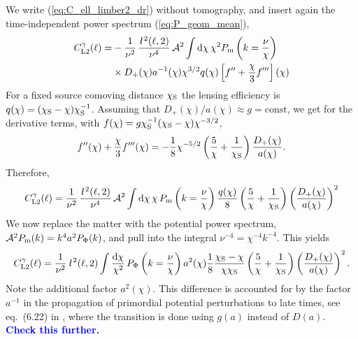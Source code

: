 \documentclass[useAMS,usenatbib]{mn2e} %
\newcommand{\ellbar}{\hbox{\it \l}\,}
\newcommand{\pref}{{\cal A}}
\newcommand{\mk}[1]{{\bf\textcolor{blue}{#1}}}
\begin{document}
\begin{appendix}
We write (\ref{eq:C_ell_limber2_dr}) without tomography, and insert again the
time-independent power spectrum (\ref{eq:P_geom_mean}),
%
\begin{align}
  C^\gamma_{{\rm L2}}(\ell) = & - \frac 1 {\nu^2} \, \frac{\ellbar^2(\ell, 2)}{\nu^4} \, \pref^2
    \int {\rm d} \chi \, \chi^{2} P_{\rm m}\left(k = \frac\nu\chi\right)
    \nonumber \\
    & \times D_+(\chi) a^{-1}(\chi) \chi^{3/2} q(\chi) \left[ f^{\prime\prime} 
      + \frac{\chi}{3} f^{\prime\prime\prime} 
    \right](\chi)
  \label{eq:C_ell_limber2_dr_notomo}
\end{align}
%
For a fixed source comoving distance $\chi_{\rm S}$ the lensing efficiency is
$q(\chi) = (\chi_{\rm S} - \chi) \chi_{\rm S}^{-1}$. Assuming that
$D_+(\chi)/a(\chi) \approx g = \mbox{const}$, we get for the derivative terms,
with $f(\chi) = g \chi_{\rm S}^{-1} (\chi_{\rm S} - \chi) \chi^{-3/2}$,
%
\begin{equation}
  f^{\prime\prime}(\chi) + \frac{\chi}{3} f^{\prime\prime\prime}(\chi)
    = - \frac 1 8 \chi^{-5/2} \left( \frac 5 \chi
          + \frac 1 {\chi_{\rm S}} \right) \frac{D_+(\chi)}{a(\chi)}.
\end{equation}
%
Therefore,
%
\begin{align}
  C^\gamma_{{\rm L2}}(\ell) = \frac 1 {\nu^2} \, \frac{\ellbar^2(\ell, 2)}{\nu^4} \, \pref^2
    \int {\rm d} \chi \, \chi \, P_{\rm m}\left(k = \frac\nu\chi\right)
    \frac{q(\chi)}{8} \left( \frac 5 \chi + \frac 1 {\chi_{\rm S}} \right)
      \left(\frac{D_+(\chi)}{a(\chi)}\right)^2 
\end{align}
%
We now replace the matter with the potential power spectrum, ${\cal A}^2 P_{\rm m}(k) = k^{4} a^2 P_\Phi(k)$, and pull into the integral $\nu^{-4} = \chi^{-4} k^{-4}$. This yields
%
\begin{align}
  C^\gamma_{{\rm L2}}(\ell) = \frac 1 {\nu^2} \, \ellbar^2(\ell, 2)
    \int \frac{{\rm d} \chi}{\chi^2} \, P_\Phi\left(k = \frac\nu\chi\right)
    a^2(\chi) \frac{1}{8} \frac{\chi_{\rm S} - \chi}{\chi \chi_{\rm S}}
    \left( \frac 5 \chi + \frac 1 {\chi_{\rm S}} \right)
      \left(\frac{D_+(\chi)}{a(\chi)}\right)^2 .
\end{align}
%
Note the additional factor $a^2(\chi)$. This difference is accounted for by the
factor $a^{-1}$ in the propagation of primordial potential perturbations to
late times, see eq.~(6.22) in \cite{vande2012}, where the transition is done
using $g(a)$ instead of $D(a)$. \mk{Check this further.}



\end{appendix}
\end{document}
